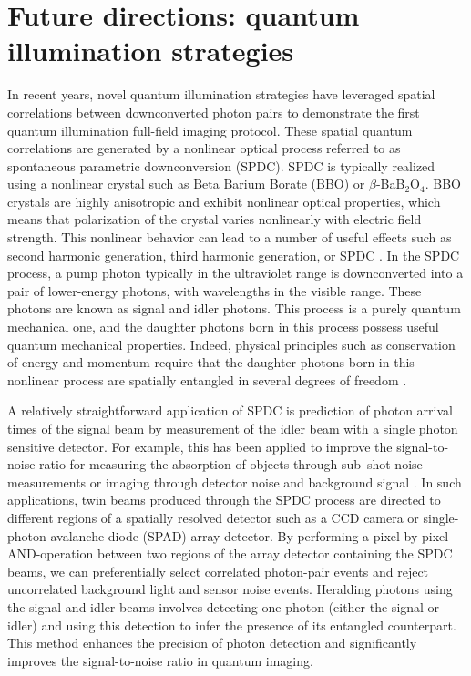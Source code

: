 \clearpage
\section{Future directions: quantum illumination strategies}

In recent years, novel quantum illumination strategies have leveraged spatial correlations between downconverted photon pairs to demonstrate the first quantum illumination full-field imaging protocol. These spatial quantum correlations are generated by a nonlinear optical process referred to as spontaneous parametric downconversion (SPDC). SPDC is typically realized using a nonlinear crystal such as Beta Barium Borate (BBO) or $\beta$-BaB$_2$O$_4$. BBO crystals are highly anisotropic and exhibit nonlinear optical properties, which means that polarization of the crystal varies nonlinearly with electric field strength. This nonlinear behavior can lead to a number of useful effects such as second harmonic generation, third harmonic generation, or SPDC \parencite{Boyd2020}. In the SPDC process, a pump photon typically in the ultraviolet range is downconverted into a pair of lower-energy photons, with wavelengths in the visible range. These photons are known as signal and idler photons. This process is a purely quantum mechanical one, and the daughter photons born in this process possess useful quantum mechanical properties. Indeed, physical principles such as conservation of energy and momentum require that the daughter photons born in this nonlinear process are spatially entangled in several degrees of freedom \parencite{Boyd2020}. 


A relatively straightforward application of SPDC is prediction of photon arrival times of the signal beam by measurement of the idler beam with a single photon sensitive detector. For example, this has been applied to improve the signal-to-noise ratio for measuring the absorption of objects through sub–shot-noise measurements \parencite{Brida2010} or imaging through detector noise and background signal \parencite{Gregory2020,Wolley2022}. In such applications, twin beams produced through the SPDC process are directed to different regions of a spatially resolved detector such as a CCD camera or single-photon avalanche diode (SPAD) array detector. By performing a pixel-by-pixel AND-operation between two regions of the array detector containing the SPDC beams, we can preferentially select correlated photon-pair events and reject uncorrelated background light and sensor noise events. Heralding photons using the signal and idler beams involves detecting one photon (either the signal or idler) and using this detection to infer the presence of its entangled counterpart. This method enhances the precision of photon detection and significantly improves the signal-to-noise ratio in quantum imaging.


